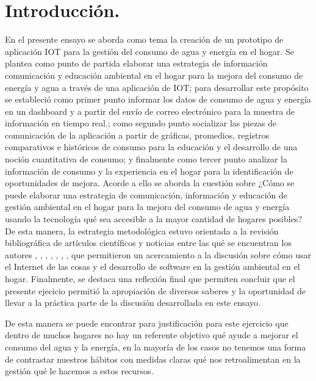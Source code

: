 \documentclass[a4paper,man,natbib]{apa6}
\begin{document}


\section{Introducción.}
En el presente ensayo se aborda como tema la creación de un prototipo de aplicación IOT para la gestión del consumo de agua y energía en el hogar. Se plantea como punto de partida elaborar una estrategia de información comunicación y educación ambiental en el hogar para la mejora del consumo de energía y agua a través de una aplicación de IOT; para desarrollar este propósito se estableció como primer punto informar los datos de consumo de agua y energía en un dashboard y a partir del envío de correo electrónico para la muestra de información en tiempo real.; como segundo punto socializar las piezas de comunicación de la aplicación a partir de gráficas, promedios, registros comparativos e históricos de consumo para la educación y el desarrollo de una noción cuantitativa de consumo; y finalmente como tercer punto analizar la información de consumo y la experiencia en el hogar para la identificación de oportunidades de mejora. Acorde a ello se aborda la cuestión sobre ¿Cómo se puede elaborar una estrategia de comunicación, información y educación de gestión ambiental en el hogar para la mejora del consumo de agua y energía usando la tecnología qué sea accesible a la mayor cantidad de hogares posibles? De esta manera, la estrategia metodológica estuvo orientada a la revisión bibliográfica de artículos científicos y noticias entre las qué se encuentran los autores \citep{7398710}, \citep{8612412}, \citep{Aguaenel98:online}, \citep{Ahorrode59:online}, \citep{Betancourt20201}, \citep{Diadeagu32:online}, \citep{Enterate82:online}, \citep{Milesdem41:online} que permitieron un acercamiento a la discusión sobre cómo usar el Internet de las cosas y el desarrollo de software en la gestión ambiental en el hogar. Finalmente, se destaca una reflexión final que permiten concluir que el presente ejecicio permitió la apropiación de diversos saberes y la oportunidad de llevar a la práctica parte de la discusión desarrollada en este ensayo.\newline

De esta manera se puede encontrar para justificación para este ejercicio que dentro de muchos hogares no hay un referente objetivo qué ayude a mejorar el consumo del agua y la energía, en la mayoría de los casos no tenemos una forma de contrastar nuestros hábitos con medidas claras qué nos retroalimentan en la gestión qué le hacemos a estos recursos.\newline
\end{document}

